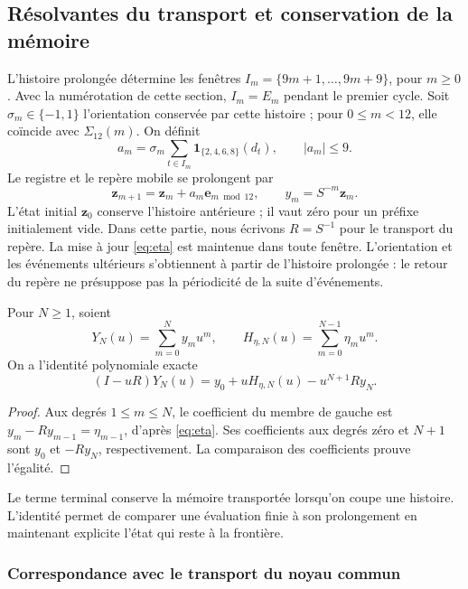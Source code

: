 \subsection{Résolvantes du transport et conservation de la mémoire}
\label{subsec:ii-memoria-resolvente}

L’histoire prolongée détermine les fenêtres
\(I_m=\{9m+1,\ldots,9m+9\}\), pour \(m\geq0\).
Avec la numérotation de cette section, \(I_m=E_m\) pendant le premier cycle.
Soit \(\sigma_m\in\{-1,1\}\) l’orientation conservée par cette histoire ;
pour \(0\leq m<12\), elle coïncide avec \(\Sigma_{12}(m)\). On définit
\[
 a_m=\sigma_m\sum_{t\in I_m}\mathbf1_{\{2,4,6,8\}}(d_t),
 \qquad |a_m|\leq9.
\]
Le registre et le repère mobile se prolongent par
\[
 \mathbf z_{m+1}=\mathbf z_m+a_m\mathbf e_{m\bmod12},\qquad y_m=S^{-m}\mathbf z_m.
\]
L’état initial \(\mathbf z_0\) conserve l’histoire antérieure ; il vaut zéro pour
un préfixe initialement vide. Dans cette partie, nous écrivons
\(R=S^{-1}\) pour le transport du repère. La mise à jour
\eqref{eq:eta} est maintenue dans toute fenêtre. L’orientation et les événements
ultérieurs s’obtiennent à partir de l’histoire prolongée : le retour du repère
ne présuppose pas la périodicité de la suite d’événements.

\begin{proposition}
Pour $N\geq1$, soient
\[
Y_N(u)=\sum_{m=0}^N y_mu^m,\qquad
H_{\eta,N}(u)=\sum_{m=0}^{N-1}\eta_mu^m.
\]
On a l’identité polynomiale exacte
\begin{equation}
(I-uR)Y_N(u)=y_0+uH_{\eta,N}(u)-u^{N+1}Ry_N.
\label{mem:identidad-finita}
\end{equation}
\end{proposition}
\begin{proof}
Aux degrés $1\leq m\leq N$, le coefficient du membre de gauche est
$y_m-Ry_{m-1}=\eta_{m-1}$, d’après \eqref{eq:eta}.
Ses coefficients aux degrés zéro et $N+1$ sont $y_0$ et $-Ry_N$,
respectivement. La comparaison des coefficients prouve l’égalité.
\end{proof}

Le terme terminal conserve la mémoire transportée lorsqu’on coupe une histoire.
L’identité permet de comparer une évaluation finie à son prolongement
en maintenant explicite l’état qui reste à la frontière.

\subsubsection{Correspondance avec le transport du noyau commun}

